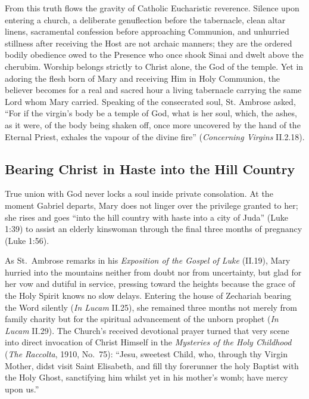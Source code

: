 From this truth flows the gravity of Catholic Eucharistic reverence. Silence upon entering a church, a deliberate genuflection before the tabernacle, clean altar linens, sacramental confession before approaching Communion, and unhurried stillness after receiving the Host are not archaic manners; they are the ordered bodily obedience owed to the Presence who once shook Sinai and dwelt above the cherubim. Worship belongs strictly to Christ alone, the God of the temple. Yet in adoring the flesh born of Mary and receiving Him in Holy Communion, the believer becomes for a real and sacred hour a living tabernacle carrying the same Lord whom Mary carried. Speaking of the consecrated soul, St. Ambrose asked, ``For if the virgin's body be a temple of God, what is her soul, which, the ashes, as it were, of the body being shaken off, once more uncovered by the hand of the Eternal Priest, exhales the vapour of the divine fire'' (\textit{Concerning Virgins} II.2.18).

\subsection{Bearing Christ in Haste into the Hill Country}\label{subsec:haste-hill-country}

True union with God never locks a soul inside private consolation. At the moment Gabriel departs, Mary does not linger over the privilege granted to her; she rises and goes ``into the hill country with haste into a city of Juda'' (Luke 1:39) to assist an elderly kinswoman through the final three months of pregnancy (Luke 1:56).

As St.\ Ambrose remarks in his \textit{Exposition of the Gospel of Luke} (II.19), Mary hurried into the mountains neither from doubt nor from uncertainty, but glad for her vow and dutiful in service, pressing toward the heights because the grace of the Holy Spirit knows no slow delays. Entering the house of Zechariah bearing the Word silently (\textit{In Lucam} II.25), she remained three months not merely from family charity but for the spiritual advancement of the unborn prophet (\textit{In Lucam} II.29). The Church's received devotional prayer turned that very scene into direct invocation of Christ Himself in the \textit{Mysteries of the Holy Childhood} (\textit{The Raccolta}, 1910, No.\ 75): ``Jesu, sweetest Child, who, through thy Virgin Mother, didst visit Saint Elisabeth, and fill thy forerunner the holy Baptist with the Holy Ghost, sanctifying him whilst yet in his mother's womb; have mercy upon us.''

